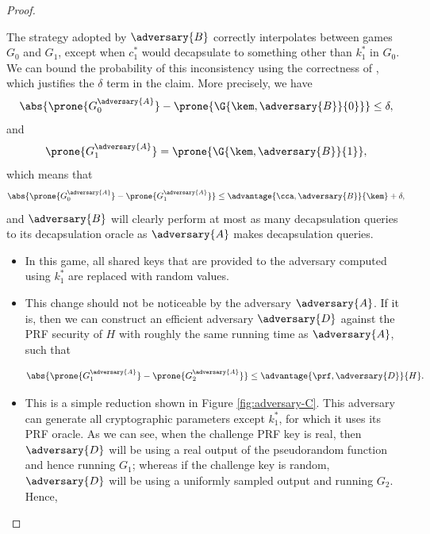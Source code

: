\begin{proof}
\begin{itemize}
                        The strategy adopted by $\adversary{B}$ correctly interpolates between games $G_0$ and $G_1$, except when $c^*_1$ would decapsulate to something other than $k_1^*$ in $G_0$.
                        We can bound the probability of this inconsistency using the correctness of \kem, which justifies the $\delta$ term in the claim.
                        More precisely, we have
                        \[
                            \abs{\prone{G^{\adversary{A}}_0} - \prone{\G{\kem, \adversary{B}}{0}}} \le \delta,
                        \]
                        and
                        \[
                            \prone{G^{\adversary{A}}_1} = \prone{\G{\kem, \adversary{B}}{1}},
                        \]
                        which means that
                        \[
                            \abs{\prone{G^{\adversary{A}}_0} - \prone{G^{\adversary{A}}_1}} \leq \advantage{\cca, \adversary{B}}{\kem} + \delta,
                        \]
                        and $\adversary{B}$ will clearly perform at most as many decapsulation queries to its \kem decapsulation oracle as $\adversary{A}$ makes decapsulation queries.
                    \end{itemize}

                    \begin{itemize}
                    \item[\textbf{Game 2}]
                        In this game, all \hqb shared keys that are provided to the adversary computed using $k_1^*$ are replaced with random values.
                    \item[\emph{Claim 2}]
                        This change should not be noticeable by the adversary $\adversary{A}$.
                        If it is, then we can construct an efficient adversary $\adversary{D}$ against the PRF security of $H$ with roughly the same running time as $\adversary{A}$, such that

                        \[
                            \abs{\prone{G^{\adversary{A}}_1} - \prone{G^{\adversary{A}}_2}} \leq \advantage{\prf, \adversary{D}}{H}.
                        \]

                    \item[\emph{Proof}]
                        This is a simple reduction shown in Figure \ref{fig:adversary-C}.
                        This adversary can generate all cryptographic parameters except $k_1^*$, for which it uses its PRF oracle.
                        As we can see, when the challenge PRF key is real, then $\adversary{D}$ will be using a real output of the pseudorandom function and hence running $G_1$; whereas if the challenge key is random, $\adversary{D}$ will be using a uniformly sampled output and running $G_2$.
                        Hence,


\end{itemize}
\end{proof}
